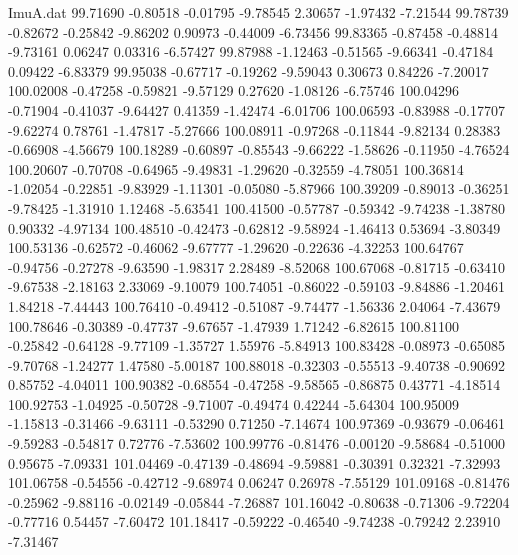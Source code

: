 \begin{filecontents}{ImuA.dat}
  99.71690   -0.80518   -0.01795   -9.78545    2.30657   -1.97432   -7.21544
  99.78739   -0.82672   -0.25842   -9.86202    0.90973   -0.44009   -6.73456
  99.83365   -0.87458   -0.48814   -9.73161    0.06247    0.03316   -6.57427
  99.87988   -1.12463   -0.51565   -9.66341   -0.47184    0.09422   -6.83379
  99.95038   -0.67717   -0.19262   -9.59043    0.30673    0.84226   -7.20017
 100.02008   -0.47258   -0.59821   -9.57129    0.27620   -1.08126   -6.75746
 100.04296   -0.71904   -0.41037   -9.64427    0.41359   -1.42474   -6.01706
 100.06593   -0.83988   -0.17707   -9.62274    0.78761   -1.47817   -5.27666
 100.08911   -0.97268   -0.11844   -9.82134    0.28383   -0.66908   -4.56679
 100.18289   -0.60897   -0.85543   -9.66222   -1.58626   -0.11950   -4.76524
 100.20607   -0.70708   -0.64965   -9.49831   -1.29620   -0.32559   -4.78051
 100.36814   -1.02054   -0.22851   -9.83929   -1.11301   -0.05080   -5.87966
 100.39209   -0.89013   -0.36251   -9.78425   -1.31910    1.12468   -5.63541
 100.41500   -0.57787   -0.59342   -9.74238   -1.38780    0.90332   -4.97134
 100.48510   -0.42473   -0.62812   -9.58924   -1.46413    0.53694   -3.80349
 100.53136   -0.62572   -0.46062   -9.67777   -1.29620   -0.22636   -4.32253
 100.64767   -0.94756   -0.27278   -9.63590   -1.98317    2.28489   -8.52068
 100.67068   -0.81715   -0.63410   -9.67538   -2.18163    2.33069   -9.10079
 100.74051   -0.86022   -0.59103   -9.84886   -1.20461    1.84218   -7.44443
 100.76410   -0.49412   -0.51087   -9.74477   -1.56336    2.04064   -7.43679
 100.78646   -0.30389   -0.47737   -9.67657   -1.47939    1.71242   -6.82615
 100.81100   -0.25842   -0.64128   -9.77109   -1.35727    1.55976   -5.84913
 100.83428   -0.08973   -0.65085   -9.70768   -1.24277    1.47580   -5.00187
 100.88018   -0.32303   -0.55513   -9.40738   -0.90692    0.85752   -4.04011
 100.90382   -0.68554   -0.47258   -9.58565   -0.86875    0.43771   -4.18514
 100.92753   -1.04925   -0.50728   -9.71007   -0.49474    0.42244   -5.64304
 100.95009   -1.15813   -0.31466   -9.63111   -0.53290    0.71250   -7.14674
 100.97369   -0.93679   -0.06461   -9.59283   -0.54817    0.72776   -7.53602
 100.99776   -0.81476   -0.00120   -9.58684   -0.51000    0.95675   -7.09331
 101.04469   -0.47139   -0.48694   -9.59881   -0.30391    0.32321   -7.32993
 101.06758   -0.54556   -0.42712   -9.68974    0.06247    0.26978   -7.55129
 101.09168   -0.81476   -0.25962   -9.88116   -0.02149   -0.05844   -7.26887
 101.16042   -0.80638   -0.71306   -9.72204   -0.77716    0.54457   -7.60472
 101.18417   -0.59222   -0.46540   -9.74238   -0.79242    2.23910   -7.31467

\end{filecontents}

